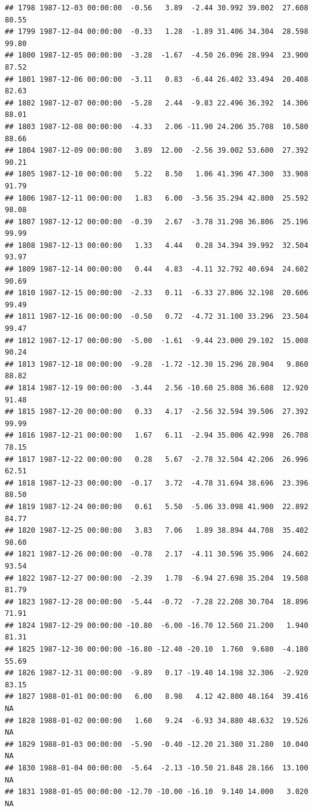 \documentclass{article}\usepackage{graphicx, color}
\makeatletter
\newenvironment{kframe}{%
 \def\at@end@of@kframe{}%
 \ifinner\ifhmode%
  \def\at@end@of@kframe{\end{minipage}}%
  \begin{minipage}{\columnwidth}%
 \fi\fi%
 \def\FrameCommand##1{\hskip\@totalleftmargin \hskip-\fboxsep
 \colorbox{shadecolor}{##1}\hskip-\fboxsep
     \hskip-\linewidth \hskip-\@totalleftmargin \hskip\columnwidth}%
 \MakeFramed {\advance\hsize-\width
   \@totalleftmargin\z@ \linewidth\hsize
   \@setminipage}}%
 {\par\unskip\endMakeFramed%
 \at@end@of@kframe}
\newenvironment{knitrout}{}{} %
\makeatother
\begin{document}
\begin{knitrout}
\begin{kframe}
\begin{verbatim}
## 1798 1987-12-03 00:00:00  -0.56   3.89  -2.44 30.992 39.002  27.608  80.55
## 1799 1987-12-04 00:00:00  -0.33   1.28  -1.89 31.406 34.304  28.598  99.80
## 1800 1987-12-05 00:00:00  -3.28  -1.67  -4.50 26.096 28.994  23.900  87.52
## 1801 1987-12-06 00:00:00  -3.11   0.83  -6.44 26.402 33.494  20.408  82.63
## 1802 1987-12-07 00:00:00  -5.28   2.44  -9.83 22.496 36.392  14.306  88.01
## 1803 1987-12-08 00:00:00  -4.33   2.06 -11.90 24.206 35.708  10.580  88.66
## 1804 1987-12-09 00:00:00   3.89  12.00  -2.56 39.002 53.600  27.392  90.21
## 1805 1987-12-10 00:00:00   5.22   8.50   1.06 41.396 47.300  33.908  91.79
## 1806 1987-12-11 00:00:00   1.83   6.00  -3.56 35.294 42.800  25.592  98.08
## 1807 1987-12-12 00:00:00  -0.39   2.67  -3.78 31.298 36.806  25.196  99.99
## 1808 1987-12-13 00:00:00   1.33   4.44   0.28 34.394 39.992  32.504  93.97
## 1809 1987-12-14 00:00:00   0.44   4.83  -4.11 32.792 40.694  24.602  90.69
## 1810 1987-12-15 00:00:00  -2.33   0.11  -6.33 27.806 32.198  20.606  99.49
## 1811 1987-12-16 00:00:00  -0.50   0.72  -4.72 31.100 33.296  23.504  99.47
## 1812 1987-12-17 00:00:00  -5.00  -1.61  -9.44 23.000 29.102  15.008  90.24
## 1813 1987-12-18 00:00:00  -9.28  -1.72 -12.30 15.296 28.904   9.860  88.82
## 1814 1987-12-19 00:00:00  -3.44   2.56 -10.60 25.808 36.608  12.920  91.48
## 1815 1987-12-20 00:00:00   0.33   4.17  -2.56 32.594 39.506  27.392  99.99
## 1816 1987-12-21 00:00:00   1.67   6.11  -2.94 35.006 42.998  26.708  78.15
## 1817 1987-12-22 00:00:00   0.28   5.67  -2.78 32.504 42.206  26.996  62.51
## 1818 1987-12-23 00:00:00  -0.17   3.72  -4.78 31.694 38.696  23.396  88.50
## 1819 1987-12-24 00:00:00   0.61   5.50  -5.06 33.098 41.900  22.892  84.77
## 1820 1987-12-25 00:00:00   3.83   7.06   1.89 38.894 44.708  35.402  98.60
## 1821 1987-12-26 00:00:00  -0.78   2.17  -4.11 30.596 35.906  24.602  93.54
## 1822 1987-12-27 00:00:00  -2.39   1.78  -6.94 27.698 35.204  19.508  81.79
## 1823 1987-12-28 00:00:00  -5.44  -0.72  -7.28 22.208 30.704  18.896  71.91
## 1824 1987-12-29 00:00:00 -10.80  -6.00 -16.70 12.560 21.200   1.940  81.31
## 1825 1987-12-30 00:00:00 -16.80 -12.40 -20.10  1.760  9.680  -4.180  55.69
## 1826 1987-12-31 00:00:00  -9.89   0.17 -19.40 14.198 32.306  -2.920  83.15
## 1827 1988-01-01 00:00:00   6.00   8.98   4.12 42.800 48.164  39.416     NA
## 1828 1988-01-02 00:00:00   1.60   9.24  -6.93 34.880 48.632  19.526     NA
## 1829 1988-01-03 00:00:00  -5.90  -0.40 -12.20 21.380 31.280  10.040     NA
## 1830 1988-01-04 00:00:00  -5.64  -2.13 -10.50 21.848 28.166  13.100     NA
## 1831 1988-01-05 00:00:00 -12.70 -10.00 -16.10  9.140 14.000   3.020     NA

\end{verbatim}
\end{kframe}
\end{knitrout}
\end{document}
